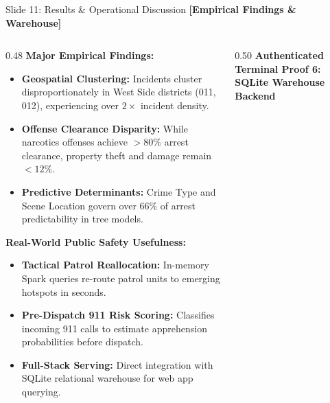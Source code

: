 \documentclass[aspectratio=169]{beamer}
\begin{document}
\begin{frame}{Slide 11: Results \& Operational Discussion \hfill \footnotesize\color{AmritaMaroon}\textbf{[Empirical Findings \& Warehouse]}}
    \begin{columns}[T]
        \begin{column}{0.48\textwidth}
            \textbf{\textcolor{NavyBlue}{Major Empirical Findings:}}
            \begin{itemize}\tiny
                \setlength{\itemsep}{2pt}
                \item \textbf{Geospatial Clustering:} Incidents cluster disproportionately in West Side districts (011, 012), experiencing over $2\times$ incident density.
                \item \textbf{Offense Clearance Disparity:} While narcotics offenses achieve $>80\%$ arrest clearance, property theft and damage remain $<12\%$.
                \item \textbf{Predictive Determinants:} Crime Type and Scene Location govern over 66\% of arrest predictability in tree models.
            \end{itemize}
            \vspace{0.04cm}
            \textbf{\textcolor{NavyBlue}{Real-World Public Safety Usefulness:}}
            \begin{itemize}\tiny
                \setlength{\itemsep}{2pt}
                \item \textbf{Tactical Patrol Reallocation:} In-memory Spark queries re-route patrol units to emerging hotspots in seconds.
                \item \textbf{Pre-Dispatch 911 Risk Scoring:} Classifies incoming 911 calls to estimate apprehension probabilities before dispatch.
                \item \textbf{Full-Stack Serving:} Direct integration with SQLite relational warehouse for web app querying.
            \end{itemize}
        \end{column}
        \begin{column}{0.50\textwidth}
            \centering
            {\scriptsize\textbf{\textcolor{NavyBlue}{Authenticated Terminal Proof 6: SQLite Warehouse Backend}}}\par
            \vspace{0.05cm}

\end{column}
\end{columns}
\end{frame}
\end{document}
